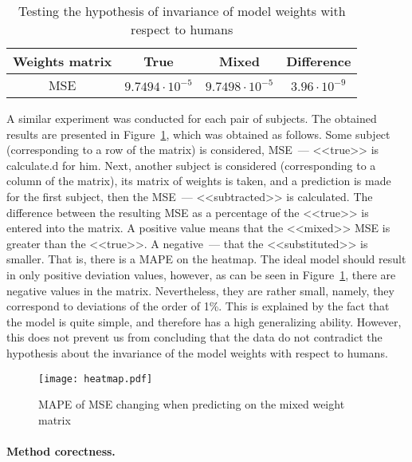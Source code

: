 \documentclass{article}
\begin{document}
\begin{table}[h!]
	\centering
	\caption{Testing the hypothesis of invariance of model weights with respect to humans}
	\begin{tabular}{|c|c|c|c|}
		\hline
		Weights matrix & True             & Mixed  & Difference        \\ \hline \hline
		MSE           & $9.7494 \cdot 10^{-5}$ & $9.7498 \cdot 10^{-5}$ & $3.96 \cdot 10^{-9}$ \\ \hline
	\end{tabular}
	\label{table:inv}
\end{table}

A similar experiment was conducted for each pair of subjects.
The obtained results are presented in Figure~\ref{fig:heatmap},
which was obtained as follows.
Some subject (corresponding to a row of the matrix) is considered, 
MSE~--- <<true>> is calculate.d for him.
Next, another subject is considered (corresponding to a column of the matrix),
its matrix of weights is taken, and a prediction is made for the first 
subject, then the MSE~--- <<subtracted>> is calculated. 
The difference between the resulting MSE as a percentage of the <<true>> is entered into the matrix.
A positive value means that the <<mixed>> MSE is greater than the <<true>>.
A negative~--- that the <<substituted>> is smaller.
That is, there is a MAPE on the heatmap.
The ideal model should result in only positive deviation values, however,
as can be seen in Figure~\ref{fig:heatmap}, there are negative values in the matrix.
Nevertheless, they are rather small, namely, they correspond to deviations of the order of 1\%.
This is explained by the fact that the model is quite simple, and therefore has a
high generalizing ability.
However, this does not prevent us from concluding that the data do not contradict the hypothesis 
about the invariance of the model weights with respect to humans.

\begin{figure}[h!]
	\centering
	\texttt{[image: heatmap.pdf]}
	\caption{MAPE of MSE changing when predicting on the mixed weight matrix}
	\label{fig:heatmap}
\end{figure}

\paragraph*{Method corectness.}
\end{document}

